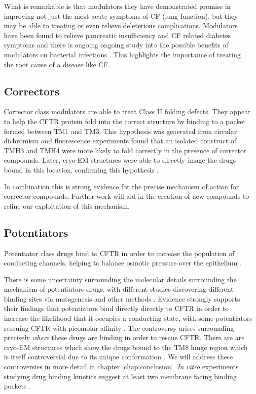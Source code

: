 What is remarkable is that modulators they have demonstrated promise in improving not just the most acute symptoms of CF (lung function), but they may be able to treating or even relieve deleterious complications. Modulators have been found to relieve pancreatic insufficiency and CF related diabetes symptoms \cite{gaines2021,lopes-pacheco2020, yi2021} and there is ongoing ongoing study into the possible benefits of modulators on bacterial infections \cite{harvey2022}. This highlights the importance of treating the root cause of a disease like CF.

\subsection{Correctors}
Corrector class modulators are able to treat Class II folding defects. They appear to help the CFTR protein fold into the correct structure by binding to a pocket formed between TM1 and TM3. This hypothesis was generated from circular dichromism \cite{greenfield2006} and fluorescence experiments found that an isolated construct of TMH3 and TMH4 were more likely to fold correctly in the presence of corrector compounds. Later, cryo-EM structures were able to directly image the drugs bound in this location, confirming this hypothesis \cite{fiedorczuk2022}. 

In combination this is strong evidence for the precise mechanism of action for corrector compounds. Further work will aid in the creation of new compounds to refine our exploitation of this mechanism.

\subsection{Potentiators}
Potentiator class drugs bind to CFTR in order to increase the population of conducting channels,  helping to balance osmotic pressure over the epithelium \cite{jih2013,yeh2017}. 

There is some uncertainty surrounding the molecular details surrounding the mechanism of potentiators drugs, with different studies discovering different binding sites via mutagenesis and other methods \cite{yeh2019, liu2019, laselva2021}. Evidence strongly supports their findings that potentiators bind directly directly to CFTR in order to increase the likelihood that it occupies a conducting state, with some potentiators rescuing CFTR with picomolar affinity \cite{csanady2019}. The controversy arises surrounding precisely \textit{where} these drugs are binding in order to rescue CFTR. There are are cryo-EM structures which show the drugs bound to the TM8 hinge region which is itself controversial due to its unique conformation \cite{liu2019}. We will address these controversies in more detail in chapter \ref{chap:conclusion}. \textit {In vitro} experiments studying drug binding kinetics suggest at least two membrane facing binding pockets \cite{csanady2019}. 

